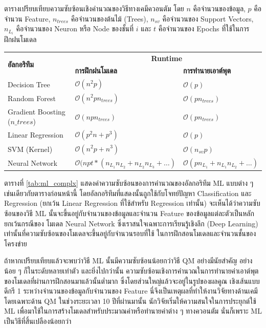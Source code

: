 \begin{adjustwidth}{-2.5 cm}{-2.5 cm}
    \centering
    \begin{threeparttable}[htbp]
    \caption{ตารางเปรียบเทียบความซับซ้อนเชิงคำนวณของวิธีทางเคมีควอนตัม\autocite{zotero-328} โดย $n$ คือจำนวนของข้อมูล, $p$ 
    คือจำนวน Feature, $n_{trees}$ คือจำนวนของต้นไม้ (Trees), $n_{sv}$ คือจำนวนของ Support Vectors, $n_{L_{i}}$ 
    คือจำนวนของ Neuron หรือ Node ของชั้นที่ $i$ และ $t$ คือจำนวนของ Epochs ที่ใช้ในการฝึกฝนโมเดล}
    \label{tab:ml_complx}
    \small
    \begin{tabular}{lll}\toprule
    \multirow{2}{*}{\textbf{อัลกอริทึม}} &\multicolumn{2}{c}{\textbf{Runtime}} \\\cmidrule{2-3}
    &\textbf{การฝึกฝนโมเดล} &\textbf{การทำนายเอาต์พุต}\\\midrule
    Decision Tree &$\mathcal{O}(n^{2}p)$ &$\mathcal{O}(p)$ \\
    Random Forest &$\mathcal{O}(n^{2}pn_{trees})$ &$\mathcal{O}(pn_{trees})$ \\
    Gradient Boosting ($n\_{trees}$) &$\mathcal{O}(npn_{trees})$ &$\mathcal{O}(pn_{trees})$ \\
    Linear Regression &$\mathcal{O}(p^{2}n+p^{3})$ &$\mathcal{O}(p)$ \\
    SVM (Kernel) &$\mathcal{O}(n^{2}p+n^{3})$ &$\mathcal{O}(n_{sv}p)$ \\
    Neural Network &$\mathcal{O}(npt*(n_{L_{1}}n_{L_{2}}+ n_{L_{2}}n_{L_{3}} + \dots)$ &$\mathcal{O}(pn_{L_{1}} 
    + n_{L_{1}}n_{L_{2}}+ \dots)$ \\
    \bottomrule
    \end{tabular}
\end{threeparttable}
\end{adjustwidth}

ตารางที่ \ref{tab:ml_complx} แสดงค่าความซับซ้อนของการคำนวณของอัลกอริทึม ML แบบต่าง ๆ เช่นเดียวกับตารางก่อนหน้านี้ 
โดยอัลกอริทึมที่แสดงนั้นถูกใช้กับโจทย์ปัญหา Classification และ Regression (ยกเว้น Linear Regression ที่ใช้สำหรับ Regression 
เท่านั้น) จะเห็นได้ว่าความซับซ้อนของวิธี ML นั้นจะขึ้นอยู่กับจำนวนของข้อมูลและจำนวน Feature ของข้อมูลแต่ละตัวเป็นหลัก ยกเว้นกรณีของ%
โมเดล Neural Network ซึ่งเราสนใจเฉพาะการเรียนรู้เชิงลึก (Deep Learning) เท่านั้นที่ความซับซ้อนของโมเดลจะขึ้นอยู่กับจำนวนรอบที่ใช้%
ในการฝึกสอนโมเดลและจำนวนชั้นของโครงข่าย

ถ้าหากเปรียบเทียบแล้วจะพบว่าวิธี ML นั้นมีความซับซ้อนน้อยกว่าวิธี QM อย่างมีนัยสำคัญ อย่างน้อย ๆ ก็ในระดับหลายเท่าตัว และยิ่งไปกว่านั้น
ความซับซ้อนเชิงการคำนวณในการทำนายค่าเอาต์พุตของโมเดลที่ผ่านการฝึกสอนมาแล้วนั้นต่ำมาก ซึ่งโดยส่วนใหญ่แล้วจะอยู่ในรูปของผลคูณ%
เชิงเส้นแบบดีกรี 1 ระหว่างจำนวนของข้อมูลกับจำนวนของ Feature นี่จึงเป็นเหตุผลที่ทำให้งานวิจัยทางด้านเคมี โดยเฉพาะด้าน QM ในช่วงระยะเวลา
10 ปีที่ผ่านมานั้น นักวิจัยเริ่มให้ความสนใจในการประยุกต์ใช้ ML เพื่อมาใช้ในการสร้างโมเดลสำหรับประมาณค่าหรือทำนายค่าต่าง ๆ ทางควอนตัม 
นั่นก็เพราะ ML เป็นวิธีที่สิ้นเปลืองน้อยกว่า

